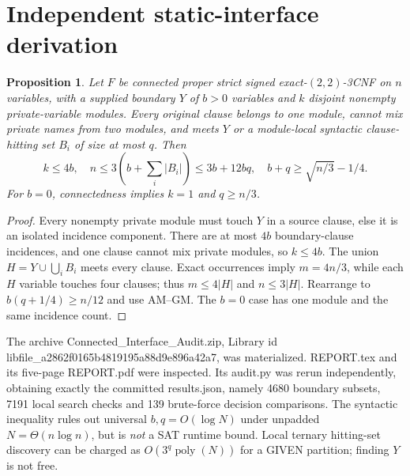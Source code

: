 \documentclass[11pt]{article}
\newtheorem{proposition}[theorem]{Proposition}
\begin{document}
\section{Independent static-interface derivation}
\begin{proposition}
Let $F$ be connected proper strict signed exact-$(2,2)$-3CNF on $n$ variables, with a supplied boundary $Y$ of $b>0$ variables and $k$ disjoint nonempty private-variable modules. Every original clause belongs to one module, cannot mix private names from two modules, and meets $Y$ or a module-local syntactic clause-hitting set $B_i$ of size at most $q$. Then
\[
 k\le4b,\quad n\le3(b+\sum_i|B_i|)\le3b+12bq,\quad b+q\ge\sqrt{n/3}-1/4.
\]
For $b=0$, connectedness implies $k=1$ and $q\ge n/3$.
\end{proposition}
\begin{proof}
Every nonempty private module must touch $Y$ in a source clause, else it is an isolated incidence component. There are at most $4b$ boundary-clause incidences, and one clause cannot mix private modules, so $k\le4b$. The union $H=Y\cup\bigcup_iB_i$ meets every clause. Exact occurrences imply $m=4n/3$, while each $H$ variable touches four clauses; thus $m\le4|H|$ and $n\le3|H|$. Rearrange to $b(q+1/4)\ge n/12$ and use AM--GM. The $b=0$ case has one module and the same incidence count.
\end{proof}
The archive Connected\_Interface\_Audit.zip, Library id libfile\_a2862f0165b4819195a88d9e896a42a7, was materialized. REPORT.tex and its five-page REPORT.pdf were inspected. Its audit.py was rerun independently, obtaining exactly the committed results.json, namely 4680 boundary subsets, 7191 local search checks and 139 brute-force decision comparisons. The syntactic inequality rules out universal $b,q=O(\log N)$ under unpadded $N=\Theta(n\log n)$, but is \emph{not} a SAT runtime bound. Local ternary hitting-set discovery can be charged as $O(3^q\operatorname{poly}(N))$ for a GIVEN partition; finding $Y$ is not free.
\end{document}
